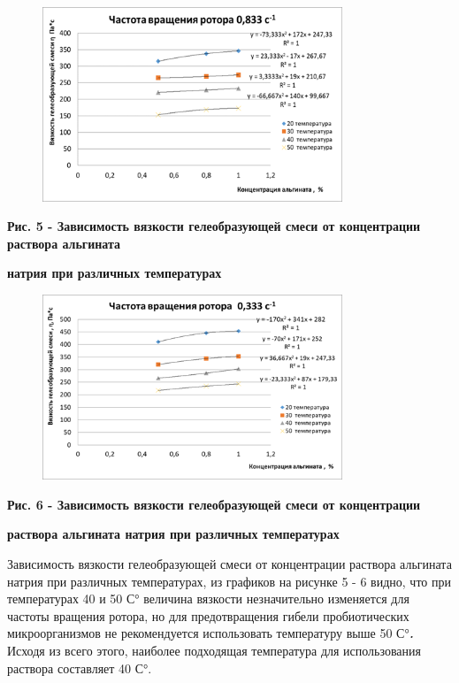 \begin{figure}[H]
	\centering
	\includegraphics[width=0.8\textwidth]{assets/314}
	\caption*{}
\end{figure}

{\bfseries Рис. 5 - Зависимость вязкости гелеобразующей смеси от
концентрации раствора альгината}

{\bfseries натрия при различных температурах}

\begin{figure}[H]
	\centering
	\includegraphics[width=0.8\textwidth]{assets/315}
	\caption*{}
\end{figure}

{\bfseries Рис. 6 - Зависимость вязкости гелеобразующей смеси от
концентрации}

{\bfseries раствора альгината натрия при различных температурах}

Зависимость вязкости гелеобразующей смеси от концентрации раствора
альгината натрия при различных температурах, из графиков на рисунке 5 -
6 видно, что при температурах 40 и 50 С° величина вязкости незначительно
изменяется для частоты вращения ротора, но для предотвращения гибели
пробиотических микроорганизмов не рекомендуется использовать температуру
выше 50 С°\emph{{\bfseries .}} Исходя из всего этого, наиболее подходящая
температура для использования раствора составляет 40 С°.

